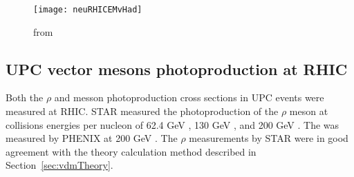   \begin{figure}[!Hhbt]
    \centering
    \texttt{[image: neuRHICEMvHad]}
    \caption{from \cite{upcNeuPHENIX}}
    \label{fig:neuRHICEMvHad}
  \end{figure}

    \subsection{ UPC vector mesons photoproduction at RHIC }
    
    Both the $\rho$ and \JPsi{} messon photoproduction cross sections in UPC 
      events were measured at RHIC.
    STAR measured the photoproduction of the $\rho$ meson at collisions 
      energies per nucleon of 62.4 GeV \cite{upcRhoSTAR12}, 130 GeV 
      \cite{upcRhoSTAR02}, and 200 GeV \cite{upcRhoSTAR08}. 
    The \JPsi{} was measured by PHENIX at 200 GeV \cite{upcJPsiPHENIX}.
    The $\rho$ measurements by STAR were in good agreement with the theory
      calculation method described in Section~\ref{sec:vdmTheory}.






